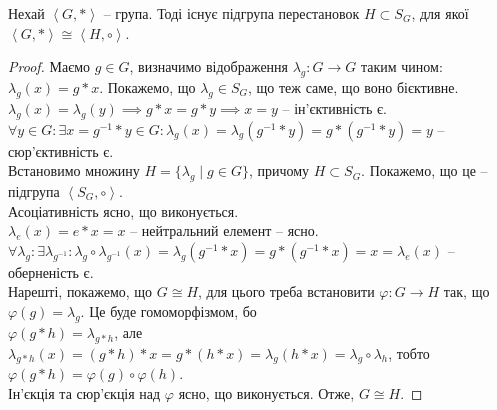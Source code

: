 \documentclass{math_library}
\begin{document}
\begin{theorem}
Нехай $\left< G,*\right>$ -- група. Тоді існує підгрупа перестановок $H \subset S_G$, для якої $\left< G, *\right> \cong \left< H, \circ \right>$.
\end{theorem}

\begin{proof}
Маємо $g \in G$, визначимо відображення $\lambda_g \colon G \to G$ таким чином: $\lambda_g(x) = g*x$. Покажемо, що $\lambda_g \in S_G$, що теж саме, що воно бієктивне.\\
$\lambda_g(x) = \lambda_g(y) \implies g*x = g*y \implies x = y$ -- ін'єктивність є.\\
$\forall y \in G: \exists x = g^{-1}*y \in G: \lambda_g(x) = \lambda_g(g^{-1}*y) = g*(g^{-1}*y) = y$ -- сюр'єктивність є.
\bigskip \\
Встановимо множину $H = \{ \lambda_g \mid g \in G\}$, причому $H \subset S_G$. Покажемо, що це -- підгрупа $\left< S_G, \circ \right>$.\\
Асоціативність ясно, що виконується.\\
$\lambda_e(x) = e*x = x$ -- нейтральний елемент -- ясно.\\
$\forall \lambda_g: \exists \lambda_{g^{-1}}: \lambda_g \circ \lambda_{g^{-1}} (x) = \lambda_g(g^{-1}*x) = g*(g^{-1}*x) = x = \lambda_e(x)$ -- оберненість є.
\bigskip \\
Нарешті, покажемо, що $G \cong H$, для цього треба встановити $\varphi \colon G \to H$ так, що $\varphi(g) = \lambda_g$. Це буде гомоморфізмом, бо\\
$\varphi(g*h) = \lambda_{g*h}$, але $\lambda_{g*h}(x) = (g*h)*x = g*(h*x) = \lambda_g(h*x) = \lambda_g \circ \lambda_h$, тобто $\varphi(g*h) = \varphi(g) \circ \varphi(h)$.\\
Ін'єкція та сюр'єкція над $\varphi$ ясно, що виконується. Отже, $G \cong H$.
\end{proof}
\fi

\end{document}
